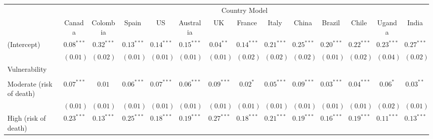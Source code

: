 
\begin{sidewaystable}
\begin{center}
\begin{scriptsize}
\begin{tabular}{l c c c c c c c c c c c c c}
\hline
 & \multicolumn{13}{c}{Country Model} \\
\cline{2-14}
 & Canada & Colombia & Spain & US & Australia & UK & France & Italy & China & Brazil & Chile & Uganda & India \\
\hline
(Intercept)                                     & $0.08^{***}$  & $0.32^{***}$  & $0.13^{***}$  & $0.14^{***}$  & $0.15^{***}$ & $0.04^{**}$   & $0.14^{***}$  & $0.21^{***}$ & $0.25^{***}$  & $0.20^{***}$  & $0.22^{***}$  & $0.23^{***}$  & $0.27^{***}$  \\
                                                & $(0.01)$      & $(0.02)$      & $(0.01)$      & $(0.01)$      & $(0.01)$     & $(0.01)$      & $(0.02)$      & $(0.02)$     & $(0.02)$      & $(0.01)$      & $(0.02)$      & $(0.04)$      & $(0.02)$      \\
Vulnerability                                   &               &               &               &               &              &               &               &              &               &               &               &               &               \\
                                                &               &               &               &               &              &               &               &              &               &               &               &               &               \\
\quad Moderate (risk of death)                  & $0.07^{***}$  & $0.01$        & $0.06^{***}$  & $0.07^{***}$  & $0.06^{***}$ & $0.09^{***}$  & $0.02^{*}$    & $0.05^{***}$ & $0.09^{***}$  & $0.03^{***}$  & $0.04^{***}$  & $0.06^{*}$    & $0.03^{**}$   \\
                                                & $(0.01)$      & $(0.01)$      & $(0.01)$      & $(0.01)$      & $(0.01)$     & $(0.01)$      & $(0.01)$      & $(0.01)$     & $(0.01)$      & $(0.01)$      & $(0.01)$      & $(0.02)$      & $(0.01)$      \\
\quad High (risk of death)                      & $0.23^{***}$  & $0.13^{***}$  & $0.25^{***}$  & $0.18^{***}$  & $0.19^{***}$ & $0.27^{***}$  & $0.18^{***}$  & $0.21^{***}$ & $0.19^{***}$  & $0.16^{***}$  & $0.19^{***}$  & $0.11^{***}$  & $0.13^{***}$  \\

\end{tabular}
\end{scriptsize}
\end{center}
\end{sidewaystable}
